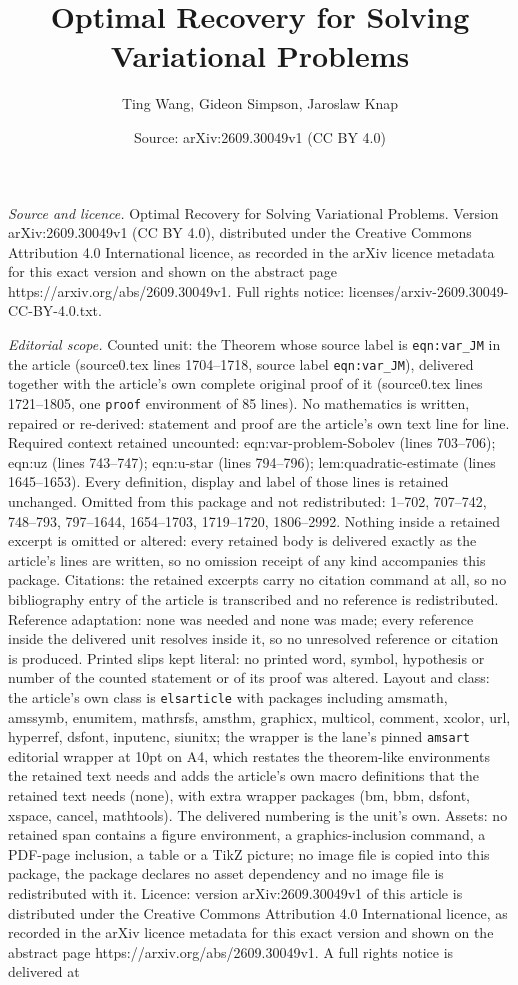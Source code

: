 \documentclass[10pt,a4paper]{amsart}
\title[Optimal Recovery for Solving Variational Problems]{Optimal Recovery for Solving Variational Problems}
\author{Ting Wang, Gideon Simpson, Jaroslaw Knap}
\date{Source: arXiv:2609.30049v1 (CC BY 4.0)}
\begin{document}
\maketitle

\noindent\emph{Source and licence.} Optimal Recovery for Solving Variational Problems. Version arXiv:2609.30049v1 (CC BY 4.0), distributed under the Creative Commons Attribution 4.0 International licence, as recorded in the arXiv licence metadata for this exact version and shown on the abstract page https://arxiv.org/abs/2609.30049v1. Full rights notice: licenses/arxiv-2609.30049-CC-BY-4.0.txt.\par\smallskip

\noindent\textit{Editorial scope.} Counted unit: the Theorem whose source label is \texttt{eqn:var\_JM} in the article (source0.tex lines 1704--1718, source label \texttt{eqn:var\_JM}), delivered together with the article's own complete original proof of it (source0.tex lines 1721--1805, one \texttt{proof} environment of 85 lines). No mathematics is written, repaired or re-derived: statement and proof are the article's own text line for line. Required context retained uncounted: eqn:var-problem-Sobolev (lines 703--706); eqn:uz (lines 743--747); eqn:u-star (lines 794--796); lem:quadratic-estimate (lines 1645--1653). Every definition, display and label of those lines is retained unchanged. Omitted from this package and not redistributed: 1--702, 707--742, 748--793, 797--1644, 1654--1703, 1719--1720, 1806--2992. Nothing inside a retained excerpt is omitted or altered: every retained body is delivered exactly as the article's lines are written, so no omission receipt of any kind accompanies this package. Citations: the retained excerpts carry no citation command at all, so no bibliography entry of the article is transcribed and no reference is redistributed. Reference adaptation: none was needed and none was made; every reference inside the delivered unit resolves inside it, so no unresolved reference or citation is produced. Printed slips kept literal: no printed word, symbol, hypothesis or number of the counted statement or of its proof was altered. Layout and class: the article's own class is \texttt{elsarticle} with packages including amsmath, amssymb, enumitem, mathrsfs, amsthm, graphicx, multicol, comment, xcolor, url, hyperref, dsfont, inputenc, siunitx; the wrapper is the lane's pinned \texttt{amsart} editorial wrapper at 10pt on A4, which restates the theorem-like environments the retained text needs and adds the article's own macro definitions that the retained text needs (none), with extra wrapper packages (bm, bbm, dsfont, xspace, cancel, mathtools). The delivered numbering is the unit's own. Assets: no retained span contains a figure environment, a graphics-inclusion command, a PDF-page inclusion, a table or a TikZ picture; no image file is copied into this package, the package declares no asset dependency and no image file is redistributed with it. Licence: version arXiv:2609.30049v1 of this article is distributed under the Creative Commons Attribution 4.0 International licence, as recorded in the arXiv licence metadata for this exact version and shown on the abstract page https://arxiv.org/abs/2609.30049v1. A full rights notice is delivered at 
\end{document}
